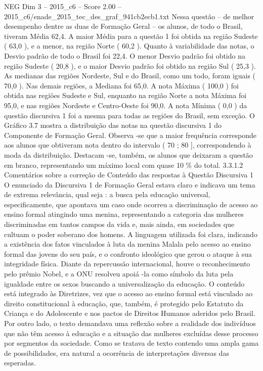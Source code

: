 \begin{textsample}{NEG Dim 3 – 2015\_c6 – Score 2.00 – 2015\_c6/enade\_2015\_tec\_des\_graf\_941cb2ecb1.txt}
Nessa questão – de melhor desempenho dentre as duas de Formação Geral – os alunos, de todo o Brasil, tiveram Média 62,4.
A maior Média para a questão 1 foi obtida na região Sudeste ( 63,0 ), e a menor, na região Norte ( 60,2 ).
Quanto à variabilidade das notas, o Desvio padrão de todo o Brasil foi 22,4.
O menor Desvio padrão foi obtido na região Sudeste ( 20,8 ), e o maior Desvio padrão foi obtido na região Sul ( 25,3 ).
As medianas das regiões Nordeste, Sul e do Brasil, como um todo, foram iguais ( 70,0 ).
Nas demais regiões, a Mediana foi 65,0.
A nota Máxima ( 100,0 ) foi obtida nas regiões Sudeste e Sul, enquanto na região Norte a nota Máxima foi 95,0, e nas regiões Nordeste e Centro-Oeste foi 90,0.
A nota Mínima ( 0,0 ) da questão discursiva 1 foi a mesma para todas as regiões do Brasil, sem exceção.
O Gráfico 3.7 mostra a distribuição das notas na questão discursiva 1 do Componente de Formação Geral.
Observa -se que a maior frequência corresponde aos alunos que obtiveram nota dentro do intervalo ( 70 ; 80 ], correspondendo à moda da distribuição.
Destacam -se, também, os alunos que deixaram a questão em branco, representando um máximo local com quase 10 \% do total. 3.3.1.2 Comentários sobre a correção de Conteúdo das respostas à Questão Discursiva 1 O enunciado da Discursiva 1 de Formação Geral estava claro e indicava um tema de extrema relevância, qual seja : a busca pela educação universal, especificamente, que apontava um caso onde ocorreu a discriminação de acesso ao ensino formal atingindo uma menina, representando a categoria das mulheres discriminadas em tantos campos da vida e, mais ainda, em sociedades que cultuam o poder soberano dos homens.
A linguagem utilizada foi clara, indicando a existência dos fatos vinculados à luta da menina Malala pelo acesso ao ensino formal das jovens do seu país, e o confronto ideológico que gerou o ataque à sua integridade física.
Diante da repercussão internacional, houve o reconhecimento pelo prêmio Nobel, e a ONU resolveu apoiá -la como símbolo da luta pela igualdade entre os sexos buscando a universalização da educação.
O conteúdo está integrado às Diretrizes, vez que o acesso ao ensino formal está vinculado ao direito constitucional à educação, que, também, é protegido pelo Estatuto da Criança e do Adolescente e nos pactos de Direitos Humanos aderidos pelo Brasil.
Por outro lado, o texto demandava uma reflexão sobre a realidade dos indivíduos que não têm acesso à educação e a situação das mulheres excluídas desse processo por segmentos da sociedade.
Como se tratava de texto contendo uma ampla gama de possibilidades, era natural a ocorrência de interpretações diversas das esperadas.

\end{textsample}

